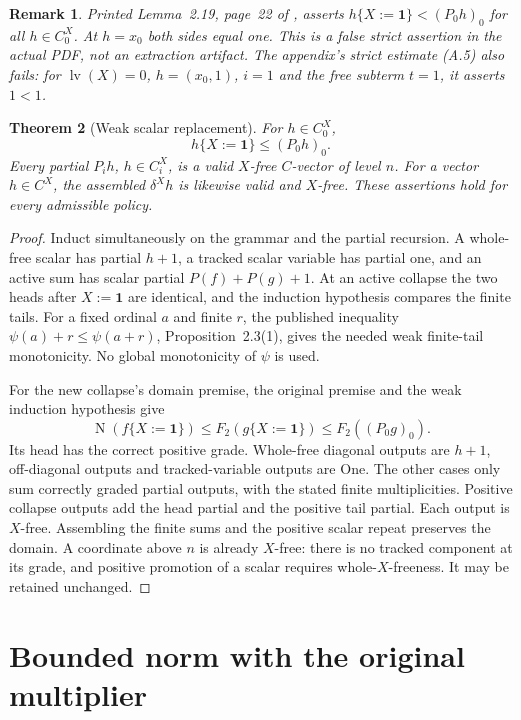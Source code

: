 \documentclass[11pt]{article}
\newtheorem{theorem}{Theorem}[section]
\newtheorem{remark}[theorem]{Remark}
\newcommand{\lv}{\operatorname{lv}}
\newcommand{\norm}{\operatorname{N}}
\newcommand{\one}{\mathbf1}
\begin{document}
\begin{remark}\label{rem:error}
Printed Lemma~2.19, page~22 of \cite{WW}, asserts
$h\{X:=\one\}<(P_0h)_0$ for all $h\in C_0^X$.
At $h=x_0$ both sides equal one. This is a false strict assertion in
the actual PDF, not an extraction artifact. The appendix's strict
estimate (A.5) also fails: for $\lv(X)=0$, $h=(x_0,1)$, $i=1$ and
the free subterm $t=1$, it asserts $1<1$.
\end{remark}

\begin{theorem}[Weak scalar replacement]\label{thm:weak}
For $h\in C_0^X$,
\[
 h\{X:=\one\}\le(P_0h)_0.
\]
Every partial $P_i h$, $h\in C_i^X$, is a valid $X$-free $C$-vector
of level $n$. For a vector $h\in C^X$, the assembled $\delta^X h$ is likewise valid and $X$-free.
These assertions hold for every admissible policy.
\end{theorem}
\begin{proof}
Induct simultaneously on the grammar and the partial recursion. A
whole-free scalar has partial $h+1$, a tracked scalar variable has
partial one, and an active sum has scalar partial $P(f)+P(g)+1$.
At an active collapse the two heads after $X:=\one$ are identical,
and the induction hypothesis compares the finite tails. For a fixed
ordinal $a$ and finite $r$, the published inequality
$\psi(a)+r\le\psi(a+r)$, Proposition~2.3(1), gives the needed weak
finite-tail monotonicity. No global monotonicity of $\psi$ is used.

For the new collapse's domain premise, the original premise and the
weak induction hypothesis give
\[
 \norm(f\{X:=\one\})
 \le F_2(g\{X:=\one\})\le F_2((P_0g)_0).
\]
Its head has the correct positive grade. Whole-free diagonal outputs
are $h+1$, off-diagonal outputs and tracked-variable outputs are One.
The other cases only sum correctly graded partial outputs, with the
stated finite multiplicities. Positive collapse outputs add the head
partial and the positive tail partial. Each output is $X$-free.
Assembling the finite sums and the positive scalar repeat preserves
the domain. A coordinate above $n$ is already $X$-free: there is no
tracked component at its grade, and positive promotion of a scalar
requires whole-$X$-freeness. It may be retained unchanged.
\end{proof}

\section{Bounded norm with the original multiplier}
\end{document}
